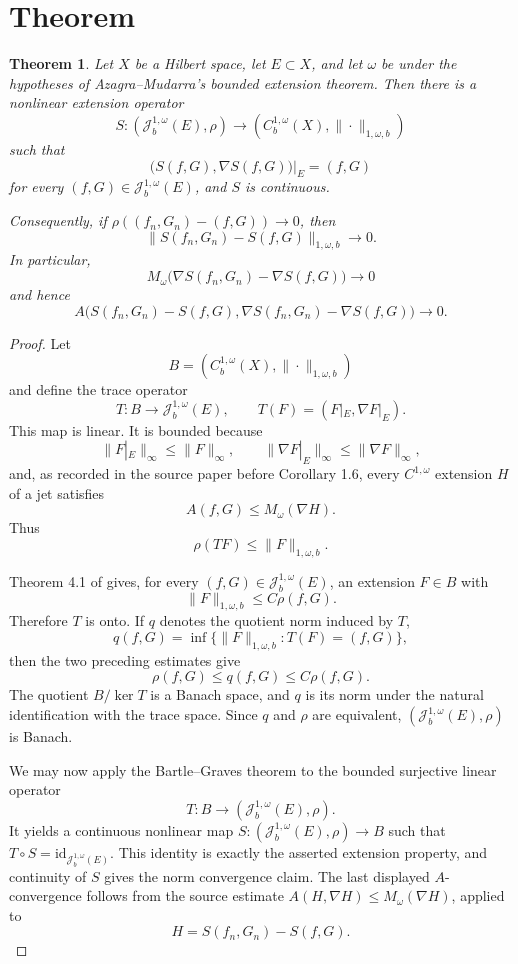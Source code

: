 \documentclass[11pt]{article}
\newtheorem{theorem}{Theorem}
\newcommand{\Jb}{\mathcal J_b^{1,\omega}(E)}
\newcommand{\Cb}{C_b^{1,\omega}(X)}
\begin{document}
\section*{Theorem}

\begin{theorem}
Let \(X\) be a Hilbert space, let \(E\subset X\), and let \(\omega\) be under
the hypotheses of Azagra--Mudarra's bounded extension theorem.  Then there is
a nonlinear extension operator
\[
S:(\Jb,\rho)\longrightarrow(\Cb,\|\cdot\|_{1,\omega,b})
\]
such that
\[
\bigl(S(f,G),\nabla S(f,G)\bigr)|_E=(f,G)
\]
for every \((f,G)\in\Jb\), and \(S\) is continuous.

Consequently, if \(\rho((f_n,G_n)-(f,G))\to0\), then
\[
\|S(f_n,G_n)-S(f,G)\|_{1,\omega,b}\to0.
\]
In particular,
\[
M_\omega\bigl(\nabla S(f_n,G_n)-\nabla S(f,G)\bigr)\to0
\]
and hence
\[
A\bigl(S(f_n,G_n)-S(f,G),
        \nabla S(f_n,G_n)-\nabla S(f,G)\bigr)\to0.
\]
\end{theorem}

\begin{proof}
Let
\[
B=(\Cb,\|\cdot\|_{1,\omega,b})
\]
and define the trace operator
\[
T:B\to \Jb,\qquad T(F)=(F|_E,\nabla F|_E).
\]
This map is linear.  It is bounded because
\[
\|F|_E\|_\infty\le \|F\|_\infty,\qquad
\|\nabla F|_E\|_\infty\le \|\nabla F\|_\infty,
\]
and, as recorded in the source paper before Corollary 1.6, every
\(C^{1,\omega}\) extension \(H\) of a jet satisfies
\[
A(f,G)\le M_\omega(\nabla H).
\]
Thus
\[
\rho(TF)\le \|F\|_{1,\omega,b}.
\]

Theorem 4.1 of \cite{AzagraMudarra} gives, for every \((f,G)\in\Jb\), an
extension \(F\in B\) with
\[
\|F\|_{1,\omega,b}\le C\rho(f,G).
\]
Therefore \(T\) is onto.  If \(q\) denotes the quotient norm induced by \(T\),
\[
q(f,G)=\inf\{\|F\|_{1,\omega,b}:T(F)=(f,G)\},
\]
then the two preceding estimates give
\[
\rho(f,G)\le q(f,G)\le C\rho(f,G).
\]
The quotient \(B/\ker T\) is a Banach space, and \(q\) is its norm under the
natural identification with the trace space.  Since \(q\) and \(\rho\) are
equivalent, \((\Jb,\rho)\) is Banach.

We may now apply the Bartle--Graves theorem to the bounded surjective linear
operator
\[
T:B\to(\Jb,\rho).
\]
It yields a continuous nonlinear map \(S:(\Jb,\rho)\to B\) such that
\(T\circ S=\mathrm{id}_{\Jb}\).  This identity is exactly the asserted
extension property, and continuity of \(S\) gives the norm convergence
claim.  The last displayed \(A\)-convergence follows from the source estimate
\(A(H,\nabla H)\le M_\omega(\nabla H)\), applied to
\[
H=S(f_n,G_n)-S(f,G).
\]
\end{proof}
\end{document}
